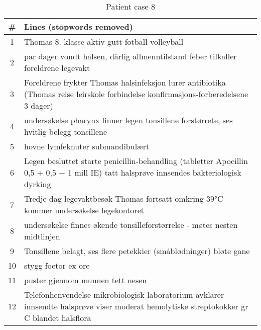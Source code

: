 \begin{table}[htbp] \footnotesize \center
\caption{Patient case 8\label{tab:case8}}
\begin{tabularx}{\textwidth}{c X}
    \toprule
    \# & Lines (stopwords removed) \\
    \midrule
    1 & Thomas 8. klasse aktiv gutt fotball volleyball \\
    2 & par dager vondt halsen, dårlig allmenntilstand feber tilkaller foreldrene legevakt \\
    3 & Foreldrene frykter Thomas halsinfeksjon lurer antibiotika (Thomas reise leirskole forbindelse konfirmasjons-forberedelsene 3 dager) \\
    4 & undersøkelse pharynx finner legen tonsillene forstørrete, ses hvitlig belegg tonsillene \\
    5 & hovne lymfeknuter submandibulært \\
    6 & Legen besluttet starte penicillin-behandling (tabletter Apocillin 0,5 + 0,5 + 1 mill IE) tatt halsprøve innsendes bakteriologisk dyrking \\
    7 & Tredje dag legevaktbesøk Thomas fortsatt omkring 39°C kommer undersøkelse legekontoret \\
    8 & undersøkelse finnes økende tonsilleforstørrelse - møtes nesten midtlinjen \\
    9 & Tonsillene belagt, ses flere petekkier (småblødninger) bløte gane \\
    10 & stygg foetor ex ore \\
    11 & puster gjennom munnen tett nesen \\
    12 & Telefonhenvendelse mikrobiologisk laboratorium avklarer innsendte halsprøve viser moderat hemolytiske streptokokker gr C blandet halsflora \\
    \bottomrule
\end{tabularx}
\end{table}

